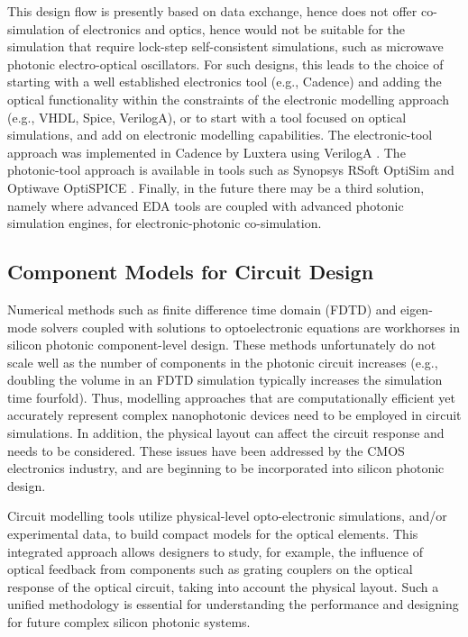 \documentclass[journal]{spie}
\begin{document}
This design flow is presently based on data exchange, hence does not offer co-simulation of electronics and optics, hence would not be suitable for the simulation that require lock-step self-consistent simulations, such as microwave photonic electro-optical oscillators.  For such designs, this leads to the choice of starting with a well established electronics tool (e.g., Cadence) and adding the optical functionality within the constraints of the electronic modelling approach (e.g., VHDL, Spice, VerilogA), or to start with a tool focused on optical simulations, and add on electronic modelling capabilities.   The electronic-tool approach was implemented in Cadence by Luxtera using VerilogA \cite{pinguet2011cmos}.  The photonic-tool approach is available in tools such as Synopsys RSoft OptiSim and Optiwave OptiSPICE \cite{gunupudi2010self-consistent}.  Finally, in the future there may be a third solution, namely where advanced EDA tools are coupled with advanced photonic simulation engines, for electronic-photonic co-simulation.  %



\subsection{Component Models for Circuit Design}

Numerical methods such as finite difference time domain (FDTD) and eigen-mode solvers coupled with solutions to optoelectronic equations are workhorses in silicon photonic component-level design.  These methods unfortunately do not scale well as the number of components in the photonic circuit increases (e.g., doubling the volume in an FDTD simulation typically increases the simulation time fourfold).  Thus, modelling approaches that are computationally efficient yet accurately represent complex nanophotonic devices need to be employed in circuit simulations.  In addition, the physical layout can affect the circuit response and needs to be considered.  These issues have been addressed by the CMOS electronics industry, and are beginning to be incorporated into silicon photonic design.  

Circuit modelling tools utilize physical-level opto-electronic simulations, and/or experimental data, to build compact models for the optical elements.  This integrated approach allows designers to study, for example, the influence of optical feedback from components such as grating couplers on the optical response of the optical circuit, taking into account the physical layout.  Such a unified methodology is essential for understanding the performance and designing for future complex silicon photonic systems.
\end{document}
